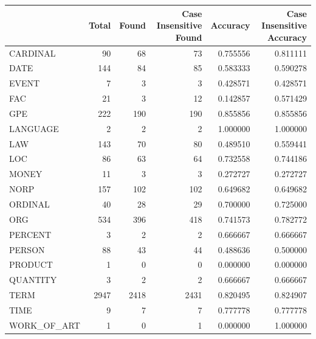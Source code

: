 \begin{tabular}{lrrrrr}
\toprule
 & Total & Found & Case Insensitive Found & Accuracy & Case Insensitive Accuracy \\
\midrule
CARDINAL & 90 & 68 & 73 & 0.755556 & 0.811111 \\
DATE & 144 & 84 & 85 & 0.583333 & 0.590278 \\
EVENT & 7 & 3 & 3 & 0.428571 & 0.428571 \\
FAC & 21 & 3 & 12 & 0.142857 & 0.571429 \\
GPE & 222 & 190 & 190 & 0.855856 & 0.855856 \\
LANGUAGE & 2 & 2 & 2 & 1.000000 & 1.000000 \\
LAW & 143 & 70 & 80 & 0.489510 & 0.559441 \\
LOC & 86 & 63 & 64 & 0.732558 & 0.744186 \\
MONEY & 11 & 3 & 3 & 0.272727 & 0.272727 \\
NORP & 157 & 102 & 102 & 0.649682 & 0.649682 \\
ORDINAL & 40 & 28 & 29 & 0.700000 & 0.725000 \\
ORG & 534 & 396 & 418 & 0.741573 & 0.782772 \\
PERCENT & 3 & 2 & 2 & 0.666667 & 0.666667 \\
PERSON & 88 & 43 & 44 & 0.488636 & 0.500000 \\
PRODUCT & 1 & 0 & 0 & 0.000000 & 0.000000 \\
QUANTITY & 3 & 2 & 2 & 0.666667 & 0.666667 \\
TERM & 2947 & 2418 & 2431 & 0.820495 & 0.824907 \\
TIME & 9 & 7 & 7 & 0.777778 & 0.777778 \\
WORK_OF_ART & 1 & 0 & 1 & 0.000000 & 1.000000 \\
\bottomrule
\end{tabular}
